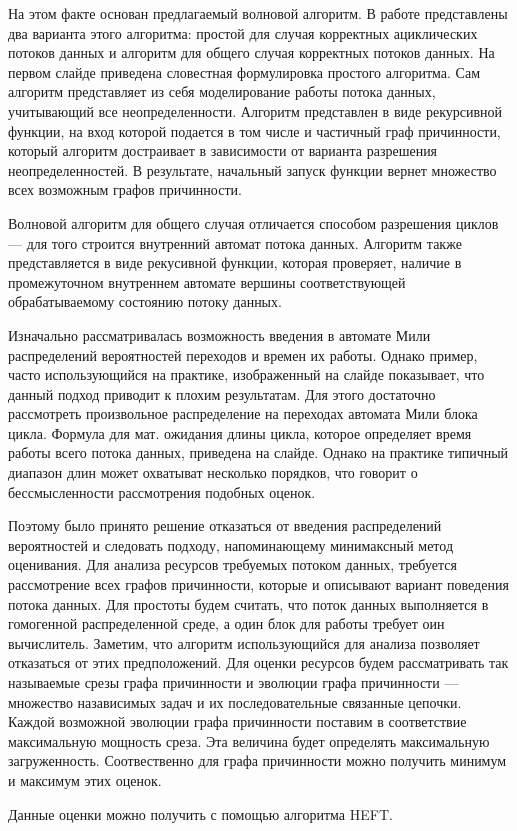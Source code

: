 \documentclass[10pt,a4paper,onecolumn]{report}
\begin{document}
  На этом факте основан предлагаемый волновой алгоритм.
  В работе представлены два варианта этого алгоритма: простой для случая корректных ациклических потоков данных и алгоритм для общего случая корректных потоков данных.
  На первом слайде приведена словестная формулировка простого алгоритма. Сам алгоритм представляет из себя моделирование работы потока данных,
  учитывающий все неопределенности. Алгоритм представлен в виде рекурсивной функции, на вход которой подается в том числе и частичный граф причинности, который
  алгоритм достраивает в зависимости от варианта разрешения неопределенностей. В результате, начальный запуск функции вернет множество всех возможным графов причинности.
  
  Волновой алгоритм для общего случая отличается способом разрешения циклов --- для того строится внутренний автомат потока данных. Алгоритм также представляется в виде
  рекусивной функции, которая проверяет, наличие в промежуточном внутреннем автомате вершины соответствующей обрабатываемому состоянию потоку данных.
  
  Изначально рассматривалась возможность введения в автомате Мили распределений вероятностей переходов и времен их работы.
  Однако пример, часто использующийся на практике, изображенный на слайде показывает, что данный подход приводит к плохим результатам. Для этого достаточно рассмотреть
  произвольное распределение на переходах автомата Мили блока цикла. Формула для мат. ожидания длины цикла, которое определяет время работы всего потока данных,
  приведена на слайде. Однако на практике типичный диапазон длин может охватыват несколько порядков, что говорит о бессмысленности рассмотрения подобных оценок.
  
  Поэтому было принято решение отказаться от введения распределений вероятностей и следовать подходу, напоминающему минимаксный метод оценивания.
  Для анализа ресурсов требуемых потоком данных, требуется рассмотрение всех графов причинности, которые и описывают вариант поведения потока данных.
  Для простоты будем считать, что поток данных выполняется в гомогенной распределенной среде, а один блок для работы требует оин вычислитель.
  Заметим, что алгоритм использующийся для анализа позволяет отказаться от этих предположений.
  Для оценки ресурсов будем рассматривать так называемые срезы графа причинности и эволюции графа причинности --- множество назависимых задач и их
  последовательные связанные цепочки.
  Каждой возможной эволюции графа причинности поставим в соответствие максимальную мощность среза. Эта величина будет определять максимальную загруженность.
  Соотвественно для графа причинности можно получить минимум и максимум этих оценок.
  
  Данные оценки можно получить с помощью алгоритма HEFT.
  
  
\end{document}
